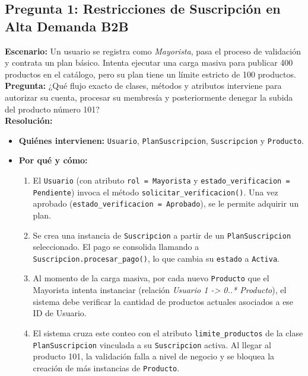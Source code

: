 \documentclass[12pt,a4paper]{report}
\begin{document}
\subsection*{Pregunta 1: Restricciones de Suscripción en Alta Demanda B2B}
\textbf{Escenario:} Un usuario se registra como \textit{Mayorista}, pasa el proceso de validación y contrata un plan básico. Intenta ejecutar una carga masiva para publicar 400 productos en el catálogo, pero su plan tiene un límite estricto de 100 productos.\\
\textbf{Pregunta:} ¿Qué flujo exacto de clases, métodos y atributos interviene para autorizar su cuenta, procesar su membresía y posteriormente denegar la subida del producto número 101?\\
\textbf{Resolución:}
\begin{itemize}
    \item \textbf{Quiénes intervienen:} \texttt{Usuario}, \texttt{PlanSuscripcion}, \texttt{Suscripcion} y \texttt{Producto}.
    \item \textbf{Por qué y cómo:}
    \begin{enumerate}
        \item El \texttt{Usuario} (con atributo \texttt{rol = Mayorista} y \texttt{estado\_verificacion = Pendiente}) invoca el método \texttt{solicitar\_verificacion()}. Una vez aprobado (\texttt{estado\_verificacion = Aprobado}), se le permite adquirir un plan.
        \item Se crea una instancia de \texttt{Suscripcion} a partir de un \texttt{PlanSuscripcion} seleccionado. El pago se consolida llamando a \texttt{Suscripcion.procesar\_pago()}, lo que cambia su \texttt{estado} a \texttt{Activa}.
        \item Al momento de la carga masiva, por cada nuevo \texttt{Producto} que el Mayorista intenta instanciar (relación \textit{Usuario 1 -> 0..* Producto}), el sistema debe verificar la cantidad de productos actuales asociados a ese ID de Usuario.
        \item El sistema cruza este conteo con el atributo \texttt{limite\_productos} de la clase \texttt{PlanSuscripcion} vinculada a su \texttt{Suscripcion} activa. Al llegar al producto 101, la validación falla a nivel de negocio y se bloquea la creación de más instancias de \texttt{Producto}.
    \end{enumerate}
\end{itemize}
\end{document}
